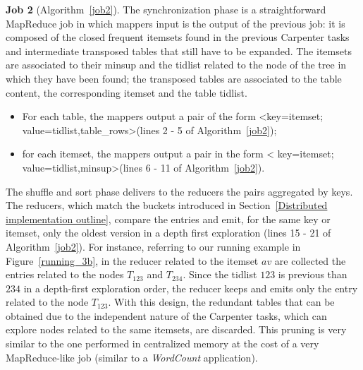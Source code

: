 \textbf{Job 2} (Algorithm~\ref{job2}). The synchronization phase is a straightforward
MapReduce job in which mappers input is the output of the previous job: it is
 composed of the closed frequent itemsets found in the previous Carpenter tasks
 and intermediate transposed tables that still have to be expanded. The itemsets
 are associated to their minsup and the tidlist related to the node of the tree
 in which they have been found; the transposed tables are associated to the
table content,
 the corresponding itemset and the table tidlist. 
\begin{itemize}
\item For each table, the mappers output a pair of the form
\textless key=itemset; value=tidlist,table\_rows\textgreater  (lines 2 - 5 of Algorithm~\ref{job2}); 
\item for each itemset, the mappers output a pair in the form \textless
key=itemset; value=tidlist,minsup\textgreater (lines 6 - 11 of Algorithm~\ref{job2}).
\end{itemize}
 The shuffle and sort phase
 delivers to the reducers the pairs aggregated by keys. The reducers, which
match the buckets introduced in Section~\ref{Distributed implementation
outline}, compare the
 entries and emit, for the same key or itemset, only the oldest version in a
 depth first exploration (lines 15 - 21 of Algorithm~\ref{job2}). For instance, referring to our running example in
Figure~\ref{running_3b}, in the reducer related to the itemset $av$ are collected the
entries related to the nodes $T_{1 2 3}$ and $T_{2 3 4}$. Since the tidlist $1 2
3$ is previous than $2 3 4$ in a depth-first exploration order, the reducer
keeps and emits only the entry related to the node $T_{1 2 3}$.
 With this design, the redundant tables that can be obtained due to the independent nature of the Carpenter tasks, which can explore nodes related to the same itemsets, are discarded. This pruning is very
similar to the one
 performed in centralized memory at the cost of a very MapReduce-like job (similar to a \textit{WordCount} application).\\


